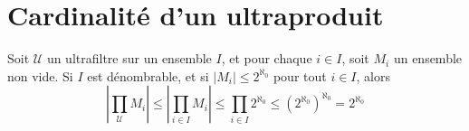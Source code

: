 %	
%	
%	
%	
%	
%	

\section{Cardinalité d'un ultraproduit}

\begin{proposition}
	Soit $\mathcal{U}$ un ultrafiltre sur un ensemble $I$, et pour chaque $i\in I$, soit $M_{i}$ un ensemble non vide. Si $I$ est dénombrable, et si $\left\lvert M_{i}\right\rvert\leq 2^{\aleph_{0}}$ pour tout $i\in I$, alors
	\[\left\lvert\prod_{\mathcal{U}}M_{i}\right\rvert\leq\left\lvert\prod_{i\in I}M_{i}\right\rvert\leq\prod_{i\in I}2^{\aleph_{0}}\leq\left(2^{\aleph_{0}}\right)^{\aleph_{0}}=2^{\aleph_{0}}\]
\end{proposition}

